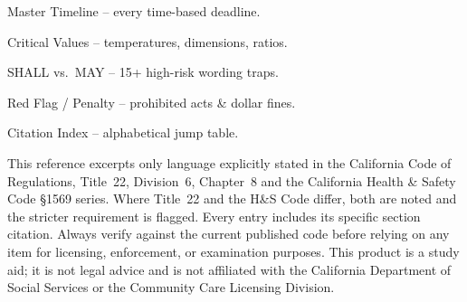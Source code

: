 
\begin{titlepage}
  \rcfeCover
  \vspace{18pt}

  \begin{rcfecallout}[title={How to Use This Cheat Sheet}]
  \footnotesize
  \begin{description}[leftmargin=5.6em,labelwidth=5em,labelsep=0.5em,itemsep=2pt,topsep=2pt]
    \item[Section 1] Master Timeline -- every time-based deadline.
    \item[Section 2] Critical Values -- temperatures, dimensions, ratios.
    \item[Section 3] SHALL vs.\ MAY -- 15+ high-risk wording traps.
    \item[Section 4] Red Flag / Penalty -- prohibited acts \& dollar fines.
    \item[Section 5] Citation Index -- alphabetical jump table.
  \end{description}
  \end{rcfecallout}

  \vspace{10pt}
  \begin{rcfecallout}[title={Mandatory Disclaimer}]
  \footnotesize
  This reference excerpts only language explicitly stated in the
  California Code of Regulations, Title~22, Division~6, Chapter~8 and
  the California Health \& Safety Code §1569 series. Where Title~22 and
  the H\&S Code differ, both are noted and the stricter requirement is
  flagged. Every entry includes its specific section citation. Always
  verify against the current published code before relying on any item
  for licensing, enforcement, or examination purposes. This product is
  a study aid; it is not legal advice and is not affiliated with the
  California Department of Social Services or the Community Care
  Licensing Division.
  \end{rcfecallout}
\end{titlepage}

\begingroup
\renewcommand{\baselinestretch}{1.15}\normalsize
\tableofcontents
\endgroup
\clearpage


